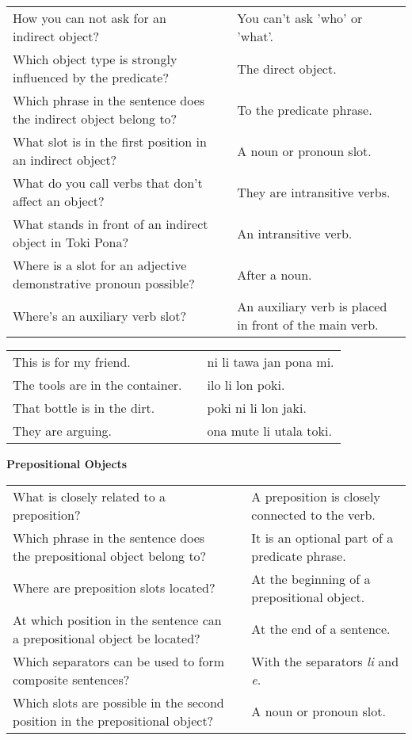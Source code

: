 \begin{supertabular}{p{5,5cm}|ll}
How you can not ask for an indirect object? && You can't ask 'who' or 'what'. \\ %
Which object type is strongly influenced by the predicate? && The direct object.  \\ %
Which phrase in the sentence does the indirect object belong to? && To the predicate phrase. \\ %
What slot is in the first position in an indirect object? && A noun or pronoun slot. \\ %
What do you call verbs that don't affect an object? && They are intransitive verbs.  \\ %
What stands in front of an indirect object in Toki Pona? && An intransitive verb. \\ %
Where is a slot for an adjective demonstrative pronoun possible? && After a noun. \\ %
Where's an auxiliary verb slot? && An auxiliary verb is placed in front of the main verb. \\ %
\end{supertabular}

\begin{supertabular}{p{5,5cm}|ll}
This is for my friend.  && ni li tawa jan pona mi. \\ %
The tools are in the container.  && ilo li lon poki. \\ %
That bottle is in the dirt.  && poki ni li lon jaki. \\ %
They are arguing. && ona mute li utala toki. \\ %
\end{supertabular} 

\textbf{Prepositional Objects} 
\label{'prepositional_objects'}

\begin{supertabular}{p{5,5cm}|ll}
What is closely related to a preposition?  && A preposition is closely connected to the verb. \\ %
Which phrase in the sentence does the prepositional object belong to?  &&  It is an optional part of a predicate phrase.  \\ %
Where are preposition slots located?  &&  At the beginning of a prepositional object. \\ %
At which position in the sentence can a prepositional object be located? && At the end of a sentence. \\ %
Which separators can be used to form composite sentences?  &&  With the separators \textit{li} and \textit{e}. \\ %
Which slots are possible in the second position in the prepositional object?  &&  A noun or pronoun slot. \\ %
\end{supertabular}

